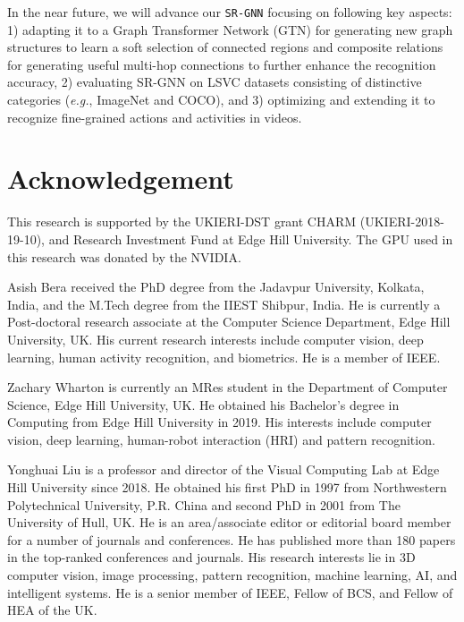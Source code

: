\documentclass[journal]{IEEEtran}
\begin{document}
In the near future, we will advance our \texttt{SR-GNN} focusing on following key aspects: 1) adapting it to a Graph Transformer Network (GTN) for generating new graph structures to learn a soft selection of connected regions and composite relations for generating useful multi-hop connections to further enhance the recognition accuracy, 2) evaluating SR-GNN on LSVC datasets consisting of distinctive
categories (\textit{e.g.}, ImageNet and COCO), and 3) optimizing and extending it to recognize fine-grained actions and activities in videos.

\section*{Acknowledgement}
This research is supported by the UKIERI-DST grant CHARM (UKIERI-2018-19-10), and Research Investment Fund at Edge Hill University. The GPU used in this research was donated by the NVIDIA. 
\ifCLASSOPTIONcaptionsoff
  \newpage
\fi


\vspace{-10mm}
\begin{IEEEbiography} {Asish Bera} received the PhD degree from  the Jadavpur University, Kolkata, India,  and the M.Tech degree from the IIEST Shibpur, India. He is currently a Post-doctoral research associate at the Computer Science Department, Edge Hill University, UK. His current research interests include computer vision, deep learning, human activity recognition, and biometrics. He is a member of IEEE.
\end{IEEEbiography}
\vspace{-10mm}
\begin{IEEEbiography}{Zachary Wharton} is currently an MRes student in the Department of Computer Science, Edge Hill University, UK. He obtained his Bachelor’s degree in Computing from Edge Hill University in 2019. His interests include computer vision, deep learning, human-robot interaction (HRI) and pattern recognition. 
\end{IEEEbiography}
\vspace{-10mm}
\begin{IEEEbiography}{Yonghuai Liu} is a professor and director of the Visual Computing Lab at Edge Hill University since 2018. He obtained his first PhD in 1997 from Northwestern Polytechnical University, P.R. China and second PhD in 2001 from The University of Hull, UK. He is an area/associate editor or editorial board member for a number of journals and conferences. He has published more than 180 papers in the top-ranked conferences and journals. His research interests lie in 3D computer vision, image processing, pattern recognition, machine learning, AI, and intelligent systems. He is a senior member of IEEE, Fellow of BCS, and Fellow of HEA of the UK.
\end{IEEEbiography}
\end{document}
